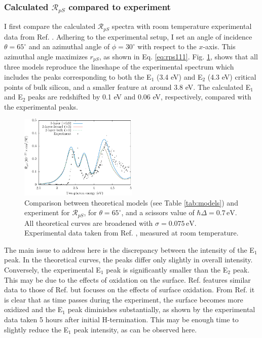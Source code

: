 
\subsubsection{Calculated \texorpdfstring{$\mathcal{R}_{pS}$}{RpS} compared to 
experiment}\label{sec:1x1RpS}

I first compare the calculated $\mathcal{R}_{pS}$ spectra with room temperature experimental data from Ref. \cite{mejiaPRB02}. Adhering to the experimental setup, I set an angle of incidence $\theta=65^{\circ}$ and an azimuthal angle of $\phi=30^\circ$ with respect to the $x$-axis. This azimuthal angle maximizes $r_{pS}$, as shown in Eq. \eqref{eq:rps111}. Fig. \ref{fig:RpS}, shows that all three models reproduce the lineshape of the experimental spectrum which includes the peaks corresponding to both the E$_{1}$ (3.4 eV) and E$_{2}$ (4.3 eV) critical points of bulk silicon, and a smaller feature at around 3.8 eV. The calculated E$_{1}$ and E$_{2}$ peaks are redshifted by 0.1 eV and 0.06 eV, respectively, compared with the experimental peaks.

\begin{figure}[H]
\centering
\includegraphics[width=0.5\textwidth]{content/figures/fig-Si1x1-Mejia_RpS}
\caption{Comparison between theoretical models (see Table \ref{tab:models}) and experiment for $\mathcal{R}_{pS}$, for $\theta=65^{\circ}$, and a scissors value of $\hbar\Delta = 0.7\,\text{eV}$. All theoretical curves are broadened with $\sigma=0.075\,\text{eV}$. Experimental data taken from Ref. \cite{mejiaPRB02}, measured at room temperature.}
\label{fig:RpS}
\end{figure}

The main issue to address here is the discrepancy between the intensity of the E$_{1}$ peak. In the theoretical curves, the peaks differ only slightly in overall intensity. Conversely, the experimental E$_{1}$ peak is significantly smaller than the E$_{2}$ peak. This may be due to the effects of oxidation on the surface. Ref. \cite{bergfeldPRL04} features similar data to those of Ref. \cite{mejiaPRB02} but focuses on the effects of surface oxidation. From Ref. \cite{bergfeldPRL04} it is clear that as time passes during the experiment, the surface becomes more oxidized and the E$_{1}$ peak diminishes substantially, as shown by the experimental data taken 5 hours after initial H-termination. This may be enough time to slightly reduce the E$_{1}$ peak intensity, as can be observed here.

